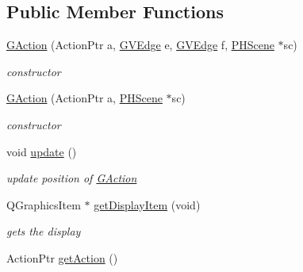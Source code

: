 \subsection*{Public Member Functions}
\begin{DoxyCompactItemize}
\item 
\hyperlink{classGAction_a697f4b533d191139a1eb401c486afff9}{G\+Action} (Action\+Ptr a, \hyperlink{structGVEdge}{G\+V\+Edge} e, \hyperlink{structGVEdge}{G\+V\+Edge} f, \hyperlink{classPHScene}{P\+H\+Scene} $\ast$sc)
\begin{DoxyCompactList}\small\item\em constructor \end{DoxyCompactList}\item 
\hyperlink{classGAction_a2e56eb084652d002e5284985c70ebe3d}{G\+Action} (Action\+Ptr a, \hyperlink{classPHScene}{P\+H\+Scene} $\ast$sc)
\begin{DoxyCompactList}\small\item\em constructor \end{DoxyCompactList}\item 
\hypertarget{classGAction_a394daac6bc228e8105790f4493b32387}{void \hyperlink{classGAction_a394daac6bc228e8105790f4493b32387}{update} ()}\label{classGAction_a394daac6bc228e8105790f4493b32387}

\begin{DoxyCompactList}\small\item\em update position of \hyperlink{classGAction}{G\+Action} \end{DoxyCompactList}\item 
Q\+Graphics\+Item $\ast$ \hyperlink{classGAction_a5092e3c2bbdd70a63c914766c0142672}{get\+Display\+Item} (void)
\begin{DoxyCompactList}\small\item\em gets the display \end{DoxyCompactList}\item 
\hypertarget{classGAction_ac9005fd701c1362eea9d7299b95672cb}{Action\+Ptr \hyperlink{classGAction_ac9005fd701c1362eea9d7299b95672cb}{get\+Action} ()}\label{classGAction_ac9005fd701c1362eea9d7299b95672cb}


\end{DoxyCompactItemize}
